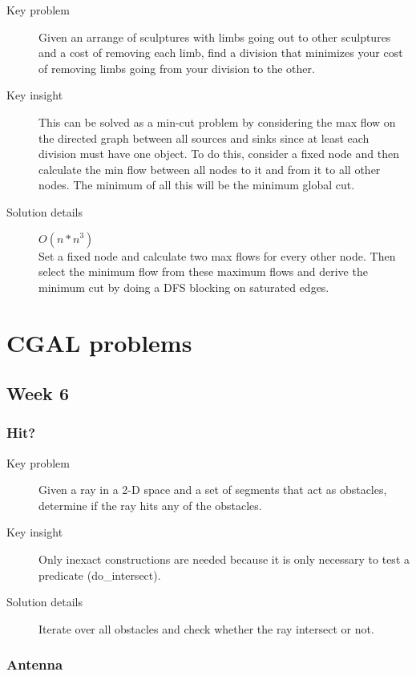 \documentclass[11pt]{book}
\begin{document}
\begin{description}
	\item[Key problem] Given an arrange of sculptures with limbs going out to other sculptures and a cost of removing each limb, find a division that minimizes your cost of removing limbs going from your division to the other.
	\item[Key insight] This can be solved as a min-cut problem by considering the max flow on the directed graph between all sources and sinks since at least each division must have one object. To do this, consider a fixed node and then calculate the min flow between all nodes to it and from it to all other nodes. The minimum of all this will be the minimum global cut.
	\item[Solution details] $O(n*n^3)$ \\ Set a fixed node and calculate two max flows for every other node. Then select the minimum flow from these maximum flows and derive the minimum cut by doing a DFS blocking on saturated edges.
\end{description}

\chapter{CGAL problems}

\section{Week 6}

\subsection{Hit?}

\begin{description}
	\item[Key problem] Given a ray in a 2-D space and a set of segments that act as obstacles, determine if the ray hits any of the obstacles.
	\item[Key insight] Only inexact constructions are needed because it is only necessary to test a predicate (do\_intersect).
	\item[Solution details] Iterate over all obstacles and check whether the ray intersect or not.
\end{description}

\subsection{Antenna}
\end{document}
